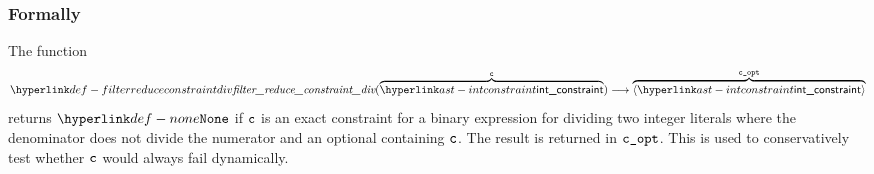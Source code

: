 \subsubsection{Formally}
\begin{mathpar}
\end{mathpar}

\begin{mathpar}
\end{mathpar}

\hypertarget{def-filterreduceconstraintdiv}{}
The function
\[
\filterreduceconstraintdiv(\overname{\intconstraint}{\vc}) \aslto \overname{\langle\intconstraint\rangle}{\vcopt}
\]
returns $\None$ if $\vc$ is an exact constraint for a binary expression for dividing two integer literals
where the denominator does not divide the numerator and an optional containing $\vc$.
The result is returned in $\vcopt$.
This is used to conservatively test whether $\vc$ would always fail dynamically.

